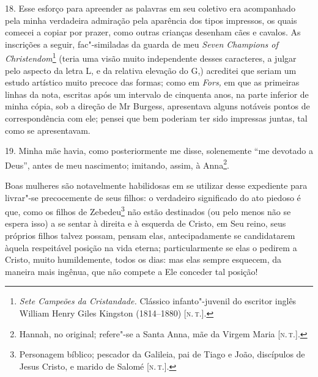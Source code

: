 18. Esse esforço para apreender as palavras em seu coletivo era
acompanhado pela minha verdadeira admiração pela aparência dos tipos
impressos, os quais comecei a copiar por prazer, como outras crianças
desenham cães e cavalos. As inscrições a seguir, fac"-similadas da guarda
de meu \emph{Seven Champions of Christendom}\footnote{\emph{Sete
  Campeões da Cristandade.} Clássico infanto"-juvenil do escritor inglês
  William Henry Giles Kingston (1814--1880) {[}\textsc{n.\,t.}{]}.} (teria uma
visão muito independente desses caracteres, a julgar pelo aspecto da
letra L, e da relativa elevação do G,) acreditei que seriam um estudo
artístico muito precoce das formas; como em \emph{Fors,} em que as
primeiras linhas da nota, escritas após um intervalo de cinquenta anos,
na parte inferior de minha cópia, sob a direção de Mr Burgess,
apresentava alguns notáveis pontos de correspondência com ele; pensei
que bem poderiam ter sido impressas juntas, tal como se apresentavam.

19. Minha mãe havia, como posteriormente me disse, solenemente ``me
devotado a Deus'', antes de meu nascimento; imitando, assim, à
Anna\footnote{Hannah, no original; refere"-se a Santa Anna, mãe da Virgem
  Maria {[}\textsc{n.\,t.}{]}.}.

Boas mulheres são notavelmente habilidosas em se utilizar desse
expediente para livrar"-se precocemente de seus filhos: o verdadeiro
significado do ato piedoso é que, como os filhos de Zebedeu\footnote{Personagem
  bíblico; pescador da Galileia, pai de Tiago e João, discípulos de
  Jesus Cristo, e marido de Salomé {[}\textsc{n.\,t.}{]}.} não estão destinados
(ou pelo menos não se espera isso) a se sentar à direita e à esquerda de
Cristo, em Seu reino, seus próprios filhos talvez possam, pensam elas,
antecipadamente se candidatarem àquela respeitável posição na vida
eterna; particularmente se elas o pedirem a Cristo, muito humildemente,
todos os dias: mas elas sempre esquecem, da maneira mais ingênua, que
não compete a Ele conceder tal posição!

